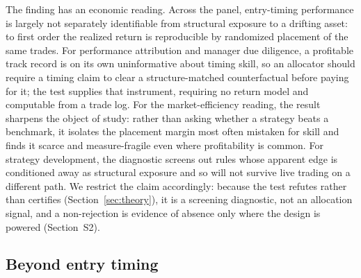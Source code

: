 \documentclass[risks,article,submit,pdftex,oneauthor]{Definitions/mdpi}
\begin{document}
The finding has an economic reading. Across the panel, entry-timing performance
is largely not separately identifiable from structural exposure to a drifting asset: to
first order the realized return is reproducible by randomized placement of the same trades.
For performance attribution and manager due diligence, a profitable track record is on its
own uninformative about timing skill, so an allocator should require a timing claim to
clear a structure-matched counterfactual before paying for it; the test supplies that
instrument, requiring no return model and computable from a trade log. For the
market-efficiency reading, the result sharpens the object of study: rather than asking
whether a strategy beats a benchmark, it isolates the placement margin most often mistaken
for skill and finds it scarce and measure-fragile even where profitability is common. For
strategy development, the diagnostic screens out rules whose apparent edge is conditioned
away as structural exposure and so will not survive live trading on a different path. We
restrict the claim accordingly: because the test refutes rather than certifies
(Section~\ref{sec:theory}), it is a screening diagnostic, not an allocation signal, and a
non-rejection is evidence of absence only where the design is powered (Section~S2).

\subsection{Beyond entry timing}
\label{sec:discussion-general}
\end{document}
